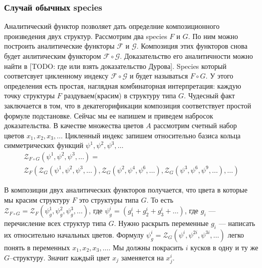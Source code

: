 \subsubsection{Случай обычных species}
Аналитический функтор позволяет дать определние композиционного произведения
двух структур. Рассмотрим два species $F$ и $G$. По ним можно построить
аналитические функторы $\mathcal F$ и $\mathcal G$. Композиция этих функторов
снова будет анлитическим функтором $\mathcal F \circ \mathcal G$. Доказательство
его аналитичности можно найти в [TODO: где или взять доказательство Дурова].
Species который соответсвует цикленному индексу $\mathcal F \circ \mathcal G$ и
будет называться $F \circ G$. У этого определения есть простая, наглядная
комбинаторная интерпретация: каждую точку структуры $F$ раздуваем(красим) в
структуру типа $G$. Чудесный факт заключается в том, что в декатегорификации
композиция соответствует простой формуле подстановке. Сейчас мы ее напишем и
приведем набросок доказательства. В качестве множества цветов $A$ рассмотрим
счетный набор цветов $x_1, x_2, x_3, \dots$ Цикленный индекс запишем
относительно базиса кольца симметрических функций $\psi^1, \psi^2, \psi^3, \dots$
\begin{multline}
\label{eq:zfg}
	\mathcal Z_{F \circ G} (\psi^1, \psi^2, \psi^3, \dots) = \\
	\mathcal Z_F(
		\mathcal Z_G(\psi^1, \psi^2, \psi^3, \dots),
		\mathcal Z_G(\psi^2, \psi^4, \psi^6, \dots),
		\mathcal Z_G(\psi^3, \psi^6, \psi^9, \dots),
		\dots
	)
\end{multline}

В композиции двух аналитических функторов получается, что цвета в которые мы
красим структуру $F$ это структуры типа $G$. То есть $\mathcal Z_{F \circ G} =
\mathcal Z_F(\psi_g^1, \psi_g^2, \psi_g^3, \dots)$, где $\psi_g^i = (g_1^i +
g_2^i + g_3^i + \dots)$, где $g_i$ --- перечисление всех структур типа $G$.
Нужно раскрыть переменные $g_i $ --- написать их относительно начальных цветов.
Формулу $\psi_g^i = \mathcal Z_G(\psi^i, \psi^{2i}, \psi^{3i}, \dots)$ легко
понять в переменных $x_1, x_2, x_3, \dots$. Мы должны покрасить $i$ кусков в
одну и ту же $G$--структуру. Значит каждый цвет $x_j$ заменяется на $x_j^i$.

